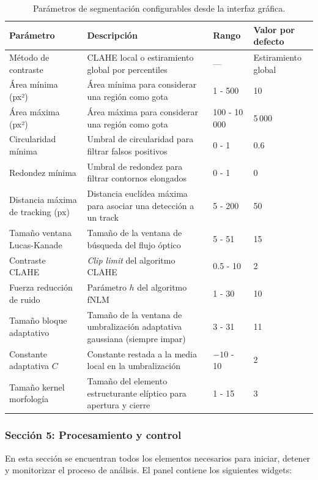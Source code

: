 \begin{table}[H]
\centering
\small
\caption{Parámetros de segmentación configurables desde la interfaz gráfica.}
\begin{tabular}{|p{4.4cm}|p{5.5cm}|p{2.2cm}|p{2.2cm}|}
\hline
\textbf{Parámetro} & \textbf{Descripción} & \textbf{Rango} & \textbf{Valor por defecto} \\
\hline
Método de contraste & CLAHE local o estiramiento global por percentiles & --- & Estiramiento global \\
\hline
Área mínima (px²) & Área mínima para considerar una región como gota & 1 - 500 & 10 \\
\hline
Área máxima (px²) & Área máxima para considerar una región como gota & 100 - 10\,000 & 5\,000 \\
\hline
Circularidad mínima & Umbral de circularidad para filtrar falsos positivos & 0 - 1 & 0.6 \\
\hline
Redondez mínima & Umbral de redondez para filtrar contornos elongados & 0 - 1 & 0 \\
\hline
Distancia máxima de tracking (px) & Distancia euclídea máxima para asociar una detección a un track & 5 - 200 & 50 \\
\hline
Tamaño ventana Lucas-Kanade & Tamaño de la ventana de búsqueda del flujo óptico & 5 - 51 & 15 \\
\hline
Contraste CLAHE & \textit{Clip limit} del algoritmo CLAHE & 0.5 - 10 & 2 \\
\hline
Fuerza reducción de ruido & Parámetro $h$ del algoritmo fNLM & 1 - 30 & 10 \\
\hline
Tamaño bloque adaptativo & Tamaño de la ventana de umbralización adaptativa gaussiana (siempre impar) & 3 - 31 & 11 \\
\hline
Constante adaptativa $C$ & Constante restada a la media local en la umbralización & $-10$ - 10 & 2 \\
\hline
Tamaño kernel morfología & Tamaño del elemento estructurante elíptico para apertura y cierre & 1 - 15 & 3 \\
\hline
\end{tabular}
\label{tab:parametros_gui}
\end{table}

\subsubsection{Sección 5: Procesamiento y control}

En esta sección se encuentran todos los elementos necesarios para iniciar, detener y monitorizar el proceso de análisis. El panel contiene los siguientes widgets:

